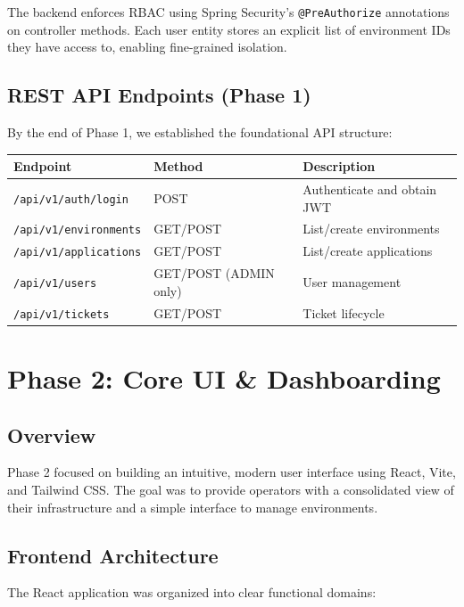 \documentclass[12pt,a4paper]{report}
\begin{document}
The backend enforces RBAC using Spring Security's \texttt{@PreAuthorize} annotations on controller methods. Each user entity stores an explicit list of environment IDs they have access to, enabling fine-grained isolation.

\subsection{REST API Endpoints (Phase 1)}

By the end of Phase 1, we established the foundational API structure:

\begin{center}
\begin{tabular}{|l|l|l|}
  \hline
  \textbf{Endpoint} & \textbf{Method} & \textbf{Description} \\
  \hline
  \texttt{/api/v1/auth/login} & POST & Authenticate and obtain JWT \\
  \hline
  \texttt{/api/v1/environments} & GET/POST & List/create environments \\
  \hline
  \texttt{/api/v1/applications} & GET/POST & List/create applications \\
  \hline
  \texttt{/api/v1/users} & GET/POST (ADMIN only) & User management \\
  \hline
  \texttt{/api/v1/tickets} & GET/POST & Ticket lifecycle \\
  \hline
\end{tabular}
\end{center}

\section{Phase 2: Core UI \& Dashboarding}

\subsection{Overview}

Phase 2 focused on building an intuitive, modern user interface using React, Vite, and Tailwind CSS. The goal was to provide operators with a consolidated view of their infrastructure and a simple interface to manage environments.

\subsection{Frontend Architecture}

The React application was organized into clear functional domains:
\end{document}

